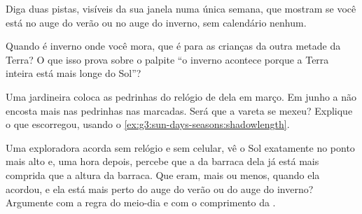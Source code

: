 \begin{exercise}[$\star$]\label{exo:g3:sun-days-seasons:8}
Diga duas pistas, visíveis da sua janela numa única semana, que
mostram se você está no auge do verão ou no auge do inverno, sem
calendário nenhum.
\end{exercise}

\begin{exercise}[$\star$]\label{exo:g3:sun-days-seasons:9}
Quando é inverno onde você mora, que  é para as crianças da
outra metade da Terra? O que isso prova sobre o palpite ``o inverno
acontece porque a Terra inteira está mais longe do Sol''?
\end{exercise}

\begin{exercise}[$\star\star$]\label{exo:g3:sun-days-seasons:10}
Uma jardineira coloca as pedrinhas do relógio de  dela em
março. Em junho a  não encosta mais nas pedrinhas nas 
marcadas. Será que a vareta se mexeu? Explique o que escorregou,
usando o \cref{ex:g3:sun-days-seasons:shadowlength}.
\end{exercise}

\begin{exercise}[$\star\star$]\label{exo:g3:sun-days-seasons:11}
Uma exploradora acorda sem relógio e sem celular, vê o Sol exatamente
no ponto mais alto e, uma hora depois, percebe que a  da
barraca dela já está mais comprida que a altura da barraca. Que 
eram, mais ou menos, quando ela acordou, e ela está mais perto do
auge do verão ou do auge do inverno? Argumente com a regra do
meio-dia e com o comprimento da .
\end{exercise}
